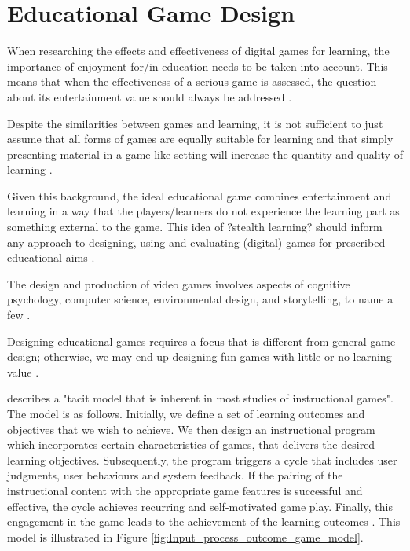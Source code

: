 \documentclass[a4paper,11.5pt]{report}
\numberwithin{figure}{section}
\numberwithin{table}{section}
\numberwithin{equation}{section}
\numberwithin{equation}{section}
\begin{document}
\section{Educational Game Design}

When researching the effects and effectiveness of digital games for learning, the importance of enjoyment for/in education needs to be taken into account. This means that when the effectiveness of a serious game is assessed, the question about its entertainment value should always be addressed \citep{Breuer2010}.

Despite the similarities between games and learning, it is not sufficient to just assume that all forms of games are equally suitable for learning and that simply presenting material in a game-like setting will increase the quantity and quality of learning \cite{Breuer2010}.

Given this background, the ideal educational game combines entertainment and learning in a way that the players/learners do not experience the learning part as something external to the game. This idea of ?stealth learning? should inform any approach to designing, using and evaluating (digital) games for prescribed educational aims \cite{Breuer2010}.

The design and production of video games involves aspects of cognitive psychology, computer science, environmental design, and storytelling, to name a few \citep{Koster2004}.

Designing educational games requires a focus that is different from general game design; otherwise, we may end up designing fun games with little or no learning value \citep{Barnes2007}.

\citeauthor{Driskell2002} describes a "tacit model that is inherent in most studies of instructional games". The model is as follows. Initially, we define a set of learning outcomes and objectives that we wish to achieve. We then design an instructional program which incorporates certain characteristics of games, that delivers the desired learning objectives. Subsequently, the program triggers a cycle that includes user judgments, user behaviours and system feedback. If the pairing of the instructional content with the appropriate game features is successful and effective, the cycle achieves recurring and self-motivated game play. Finally, this engagement in the game leads to the achievement of the learning outcomes \citep{Driskell2002}. This model is illustrated in Figure \ref{fig:Input_process_outcome_game_model}.
\end{document}
